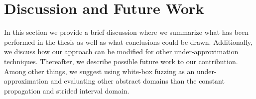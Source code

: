 \documentclass{kththesis}
\newcommand{\fbcomment}[1]{{#1}}
\renewcommand{\fbcomment}[1]{}
\begin{document}
\chapter{Discussion and Future Work}\label{chap:discussionAndConclusions}
\fbcomment{\color{red}Goal: Discuss the results and draw conclusions}
In this section we provide a brief discussion where we summarize what has been performed in the thesis as well as what conclusions could be drawn. Additionally, we discuss how our approach can be modified for other under-approximation techniques. Thereafter, we describe possible future work to our contribution. Among other things, we suggest using white-box fuzzing as an under-approximation and evaluating other abstract domains than the constant propagation and strided interval domain.
\end{document}
